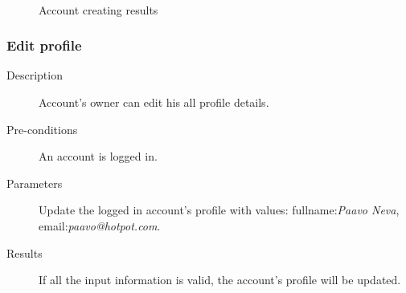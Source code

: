 \begin{figure}[bth]
\myfloatalign
{} \quad
{} \\
\caption[Login results]{Account creating results}
\label{fig:user_guide:account:account_create_result}
\end{figure}

\clearpage

\subsubsection{Edit profile}
\label{ch:result:user_guide:account:profile}

\begin{description}
\item[Description] Account's owner can edit his all profile details.
\item[Pre-conditions] An account is logged in.
\item[Parameters] Update the logged in account's profile with values: fullname:\emph{Paavo Neva}, email:\emph{paavo@hotpot.com}.
\item[Results] If all the input information is valid, the account's profile will be updated.
\end{description}

